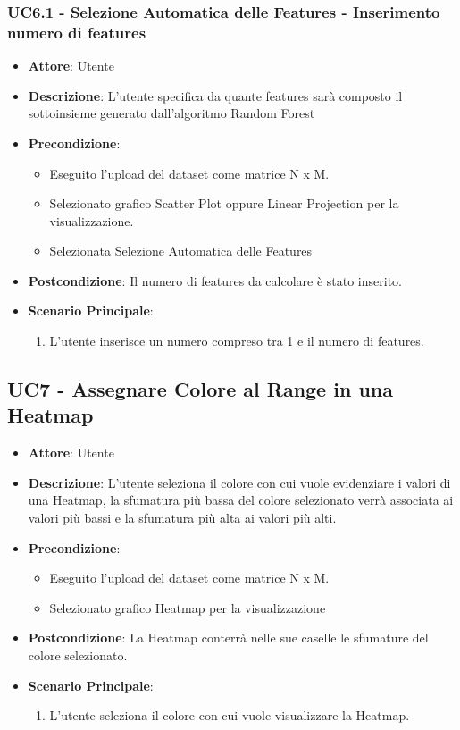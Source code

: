     \subsubsection{UC6.1 - Selezione Automatica delle Features - Inserimento numero di features}
    \label{uc6.1}
    \begin{itemize}
    \item \textbf{Attore}: Utente
    \item \textbf{Descrizione}: L'utente specifica da quante features sarà composto il sottoinsieme generato dall'algoritmo Random Forest  
    \item \textbf{Precondizione}: 
    \begin{itemize}
        \item Eseguito l'upload del dataset come matrice N x M.
        \item Selezionato grafico Scatter Plot oppure Linear Projection per la visualizzazione.
        \item Selezionata Selezione Automatica delle Features
    \end{itemize}  
    \item \textbf{Postcondizione}: Il numero di features da calcolare è stato inserito.
    \item \textbf{Scenario Principale}: 
    \begin{enumerate}
        \item L'utente inserisce un numero compreso tra 1 e il numero di features.
    \end{enumerate}  
    \end{itemize}
  
    
        \subsection{UC7 - Assegnare Colore al Range in una Heatmap}
    \begin{itemize}
    \item \textbf{Attore}: Utente
    \item \textbf{Descrizione}: L'utente seleziona il colore con cui vuole evidenziare i valori di una Heatmap, la sfumatura più bassa del colore selezionato verrà associata ai valori più bassi e la sfumatura più alta ai valori più alti.
    \item \textbf{Precondizione}: 
    \begin{itemize}
        \item Eseguito l'upload del dataset come matrice N x M.
        \item Selezionato grafico Heatmap per la visualizzazione
    \end{itemize}  
    \item \textbf{Postcondizione}: La Heatmap conterrà nelle sue caselle le sfumature del colore selezionato.
    \item \textbf{Scenario Principale}: 
    \begin{enumerate}
        \item L'utente seleziona il colore con cui vuole visualizzare la Heatmap.
    \end{enumerate}  
    \end{itemize}
    
